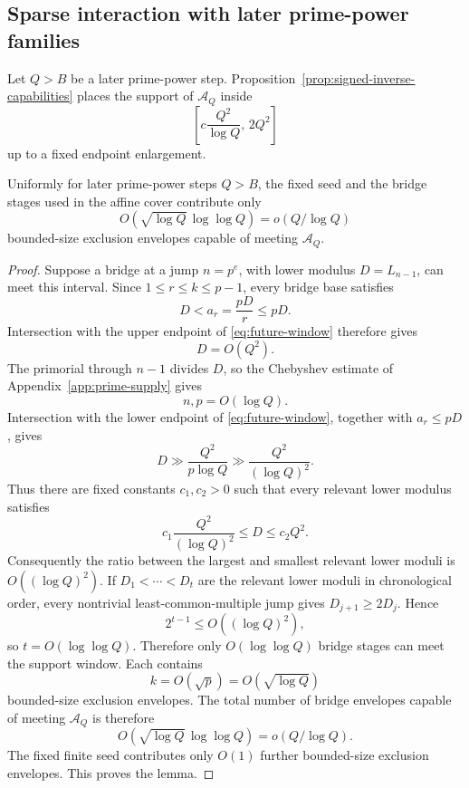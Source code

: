 \subsection{Sparse interaction with later prime-power families}

Let $Q>B$ be a later prime-power step.  Proposition~\ref{prop:signed-inverse-capabilities} places the support of $\mathcal A_Q$ inside
\begin{equation}\label{eq:future-window}
\left[c\frac{Q^2}{\log Q},\,2Q^2\right]
\end{equation}
up to a fixed endpoint enlargement.

\begin{lemma}\label{lem:sparse-bridge-interaction}
Uniformly for later prime-power steps $Q>B$, the fixed seed and the bridge stages used in the affine cover contribute only
\[
O(\sqrt{\log Q}\,\log\log Q)
=o(Q/\log Q)
\]
bounded-size exclusion envelopes capable of meeting $\mathcal A_Q$.
\end{lemma}

\begin{proof}
Suppose a bridge at a jump $n=p^e$, with lower modulus $D=L_{n-1}$, can meet this interval.  Since $1\le r\le k\le p-1$, every bridge base satisfies
\[
D<a_r=\frac{pD}{r}\le pD.
\]
Intersection with the upper endpoint of \eqref{eq:future-window} therefore gives
\[
D=O(Q^2).
\]
The primorial through $n-1$ divides $D$, so the Chebyshev estimate of Appendix~\ref{app:prime-supply} gives
\[
n,p=O(\log Q).
\]
Intersection with the lower endpoint of \eqref{eq:future-window}, together with $a_r\le pD$, gives
\[
D\gg\frac{Q^2}{p\log Q}
\gg\frac{Q^2}{(\log Q)^2}.
\]
Thus there are fixed constants $c_1,c_2>0$ such that every relevant lower modulus satisfies
\[
c_1\frac{Q^2}{(\log Q)^2}\le D\le c_2Q^2.
\]
Consequently the ratio between the largest and smallest relevant lower moduli is $O((\log Q)^2)$.  If $D_1<\cdots<D_t$ are the relevant lower moduli in chronological order, every nontrivial least-common-multiple jump gives $D_{j+1}\ge2D_j$.  Hence
\[
2^{t-1}\le O((\log Q)^2),
\]
so $t=O(\log\log Q)$.  Therefore only $O(\log\log Q)$ bridge stages can meet the support window.  Each contains
\[
k=O(\sqrt p)=O(\sqrt{\log Q})
\]
bounded-size exclusion envelopes.  The total number of bridge envelopes capable of meeting $\mathcal A_Q$ is therefore
\begin{equation}\label{eq:bridge-footprint}
O(\sqrt{\log Q}\,\log\log Q)
=o(Q/\log Q).
\end{equation}
The fixed finite seed contributes only $O(1)$ further bounded-size exclusion envelopes.  This proves the lemma.
\end{proof}

